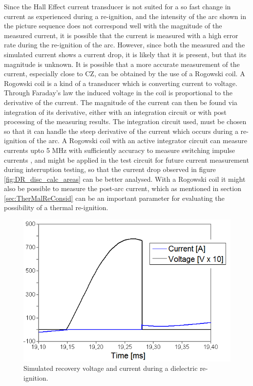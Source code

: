 \documentclass[10pt,b5paper,twoside]{article}
\begin{document}
Since the Hall Effect current transducer is not suited for a so fast change in current as experienced during a re-ignition, and the intensity of the arc shown in the picture sequence does not correspond well with the magnitude of the measured current, it is possible that the current is measured with a high error rate during the re-ignition of the arc. However, since both the measured and the simulated current shows a current drop, it is likely that it is present, but that its magnitude is unknown. It is possible that a more accurate measurement of the current, especially close to CZ, can be obtained by the use of a Rogowski coil. A Rogowski coil is a kind of a transducer which is converting current to voltage. Through Faraday's law the induced voltage in the coil is proportional to the derivative of the current. The magnitude of the current can then be found via integration of its derivative, either with an integration circuit or with post processing of the measuring results. The integration circuit used, must be chosen so that it can handle the steep derivative of the current which occurs during a re-ignition of the arc. A Rogowski coil with an active integrator circuit can measure currents upto 5 MHz with sufficiently accuracy to measure switching impulse currents \cite{bib:SwitchingImpulseCurrent}, and might be applied in the test circuit for future current measurement during interruption testing, so that the current drop observed in figure \ref{fig:DR_disc_calc_areas} can be better analysed. With a Rogowski coil it might also be possible to measure the post-arc current, which as mentioned in section \ref{sec:TherMalReConsid} can be an important parameter for evaluating the possibility of a thermal re-ignition.

\begin{figure}[H]
\centering
\includegraphics[scale=0.65]{Bilder/Results/ATPdraw_Over_CurrentandVoltage_2_label.png}
\caption{Simulated recovery voltage and current during a dielectric re-ignition.} \label{fig:DR_ATP_OVER}
\end{figure}
\end{document}
